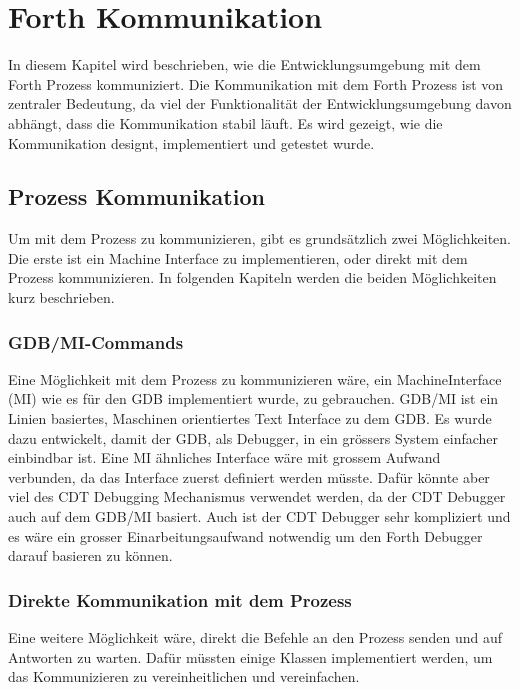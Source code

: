 \chapter{Forth Kommunikation}
\label{chap:forthcommunication}

In diesem Kapitel wird beschrieben, wie die Entwicklungsumgebung mit dem Forth Prozess kommuniziert. Die Kommunikation mit dem Forth Prozess ist von zentraler Bedeutung, da viel der Funktionalität der Entwicklungsumgebung davon abhängt, dass die Kommunikation stabil läuft. Es wird gezeigt, wie die Kommunikation designt, implementiert und getestet wurde.

\section{Prozess Kommunikation}
Um mit dem Prozess zu kommunizieren, gibt es grundsätzlich zwei Möglichkeiten. Die erste ist ein Machine Interface zu implementieren, oder direkt mit dem Prozess kommunizieren. In folgenden Kapiteln werden die beiden Möglichkeiten kurz beschrieben.

\subsection{GDB/MI-Commands}

Eine Möglichkeit mit dem Prozess zu kommunizieren wäre, ein MachineInterface (MI) wie es für den GDB implementiert wurde, zu gebrauchen. GDB/MI ist ein Linien basiertes, Maschinen orientiertes Text Interface zu dem GDB. Es wurde dazu entwickelt, damit der GDB, als Debugger, in ein grössers System einfacher einbindbar ist.\cite{gdb} Eine MI ähnliches Interface wäre mit grossem Aufwand verbunden, da das Interface zuerst definiert werden müsste. Dafür könnte aber viel des CDT Debugging Mechanismus verwendet werden, da der CDT Debugger auch auf dem GDB/MI basiert. Auch ist der CDT Debugger sehr kompliziert\cite{mieclipse} und es wäre ein grosser Einarbeitungsaufwand notwendig um den Forth Debugger darauf basieren zu können.\cite{mieclipse}

\subsection{Direkte Kommunikation mit dem Prozess}

Eine weitere Möglichkeit wäre, direkt die Befehle an den Prozess senden und auf Antworten zu warten. Dafür müssten einige Klassen implementiert werden, um das Kommunizieren zu vereinheitlichen und vereinfachen.

